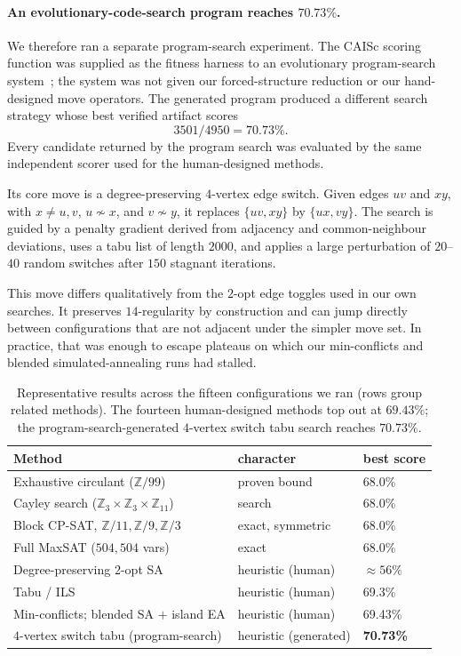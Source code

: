 \documentclass{article}
\begin{document}
\paragraph{An evolutionary-code-search program reaches $70.73\%$.}
We therefore ran a separate program-search experiment. The CAISc scoring
function was supplied as the fitness harness to an evolutionary program-search
system~\cite{alphaevolve}; the system was not given our forced-structure
reduction or our hand-designed move operators. The generated program produced a
different search strategy whose best verified artifact scores
\[
3501/4950=70.73\%.
\]
Every candidate returned by the program search was evaluated by the same
independent scorer used for the human-designed methods.

Its core move is a degree-preserving $4$-vertex edge switch. Given edges
$uv$ and $xy$, with $x\neq u,v$, $u\not\sim x$, and $v\not\sim y$, it replaces
$\{uv,xy\}$ by $\{ux,vy\}$. The search is guided by a penalty gradient derived
from adjacency and common-neighbour deviations, uses a tabu list of length
$2000$, and applies a large perturbation of $20$--$40$ random switches after
$150$ stagnant iterations.

This move differs qualitatively from the $2$-opt edge toggles used in our own
searches. It preserves $14$-regularity by construction and can jump directly
between configurations that are not adjacent under the simpler move set. In
practice, that was enough to escape plateaus on which our min-conflicts and
blended simulated-annealing runs had stalled.

\begin{table}[t]
  \caption{Representative results across the fifteen configurations we ran
  (rows group related methods). The fourteen human-designed methods top out
  at $69.43\%$; the program-search-generated $4$-vertex switch tabu search
  reaches $70.73\%$.}
  \label{tab:methods}
  \centering\small
  \begin{tabular}{lll}
    \toprule
    Method & character & best score \\
    \midrule
    Exhaustive circulant ($\mathbb{Z}/99$) & proven bound & 68.0\% \\
    Cayley search ($\mathbb{Z}_3{\times}\mathbb{Z}_3{\times}\mathbb{Z}_{11}$) & search & 68.0\% \\
    Block CP-SAT, $\mathbb{Z}/11,\mathbb{Z}/9,\mathbb{Z}/3$ & exact, symmetric & 68.0\% \\
    Full MaxSAT ($504{,}504$ vars) & exact & 68.0\% \\
    Degree-preserving 2-opt SA & heuristic (human) & $\approx56\%$ \\
    Tabu / ILS & heuristic (human) & 69.3\% \\
    Min-conflicts; blended SA $+$ island EA & heuristic (human) & 69.43\% \\
    $4$-vertex switch tabu (program-search) & heuristic (generated) & \textbf{70.73\%} \\
    \bottomrule
  \end{tabular}
\end{table}
\end{document}
